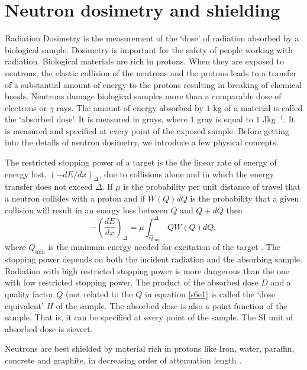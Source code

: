\documentclass{article}
\numberwithin{equation}{section}
\begin{document}
\section{Neutron dosimetry and shielding}\label{s6}
Radiation Dosimetry is the measurement of the `dose' of radiation absorbed by
a biological sample. Dosimetry is important for the safety of people working
with radiation. Biological materials are rich in protons. When they are
exposed to neutrons, the elastic collision of the neutrons and the protons
leads to a transfer of a substantial amount of energy to the protons resulting
in breaking of chemical bonds. Neutrons damage biological samples more than
a comparable dose of electrons or $\gamma$ rays. The amount of energy absorbed
by $1$ kg of a material is called the `absorbed dose'. It is measured in grays,
where $1$ gray is equal to $1$ Jkg${}^{-1}$. It is measured and specified at 
every point of the exposed sample. Before getting into the details of neutron
dosimetry, we introduce a few physical concepts.

The restricted stopping power of a target is the the linear rate of energy of
energy lost,  $(-dE/dx)_\Delta$, due to collisions alone and in which the
energy transfer does not exceed $\Delta$. If $\mu$ is the probability per unit
distance of travel that a neutron collides with a proton and if $W(Q)dQ$ is the 
probability that a given collision will result in an energy loss between $Q$
and $Q + dQ$ then
\begin{equation}\label{s6e1}
-\left(\frac{dE}{dx}\right)_\Delta = \mu\int_{Q_{\text{min}}}^\Delta QW(Q)dQ,
\end{equation}
where $Q_{\text{min}}$ is the minimum energy needed for excitation of the 
target \cite{turner2008atoms}. The stopping power depends on both the 
incident radiation and the absorbing sample. Radiation with high restricted
stopping power is more dangerous than the one with low restricted stopping 
power. The product of the absorbed dose $D$ and a quality factor $Q$ (not 
related to the $Q$ in equation \eqref{s6e1} is called the `dose equivalent'
$H$ of the sample. The absorbed dose is also a point function of the sample.
That is, it can be specified at every point of the sample. The SI unit of 
absorbed dose is sievert.

Neutrons are best shielded by material rich in protons like Iron, water, 
paraffin, concrete and graphite, in decreasing order of attenuation length
\cite{turner2008atoms}.
\end{document}
